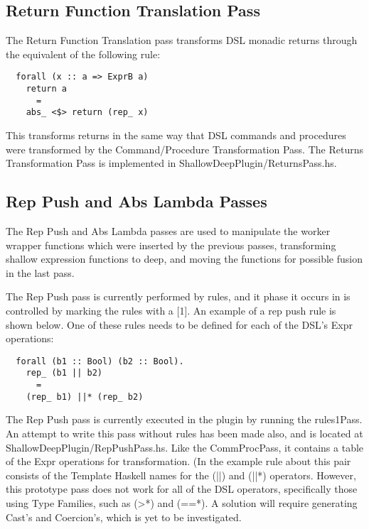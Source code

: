 \documentclass[11pt, oneside]{article}   	%
\begin{document}
\subsection{Return Function Translation Pass}

The Return Function Translation pass transforms DSL monadic returns through
the equivalent of the following rule:

\begin{verbatim}
  forall (x :: a => ExprB a)
    return a
      =
    abs_ <$> return (rep_ x)
\end{verbatim}

This transforms returns in the same way that DSL commands and procedures
were transformed by the Command/Procedure Transformation Pass.
The Returns Transformation Pass is implemented in ShallowDeepPlugin/ReturnsPass.hs.

\subsection{Rep Push and Abs Lambda Passes}

The Rep Push and Abs Lambda passes are used to manipulate the worker
wrapper functions which were inserted by the previous passes, transforming
shallow expression functions to deep, and moving the functions for
possible fusion in the last pass.

The Rep Push pass is currently performed by rules, and it phase it occurs in
is controlled by marking the rules with a [1].  An example of a rep push rule
is shown below.  One of these rules needs to be defined for each of the DSL's
Expr operations:

\begin{verbatim}
  forall (b1 :: Bool) (b2 :: Bool).
    rep_ (b1 || b2)
      =
    (rep_ b1) ||* (rep_ b2)
\end{verbatim}

The Rep Push pass is currently executed in the plugin by running the rules1Pass. 
An attempt to write this pass without rules has been made also, and is
located at ShallowDeepPlugin/RepPushPass.hs.  Like the CommProcPass,
it contains a table of the Expr operations for transformation.  (In the example 
rule about this pair consists of the Template Haskell names for the (||) and (||*)
operators.  However, this prototype pass does not work for all of the DSL 
operators, specifically those using Type Families, such as (>*) and (==*).
A solution will require generating Cast's and Coercion's, which is yet to
be investigated.
\end{document}
